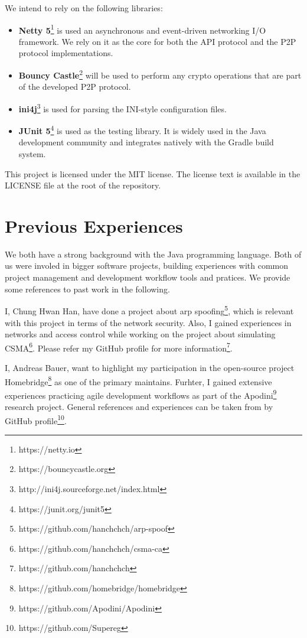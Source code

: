 \documentclass[a4paper, 11pt]{article}
\begin{document}
    We intend to rely on the following libraries:
    \begin{itemize}
        \setlength\itemsep{0em}
        \item \textbf{Netty 5}\footnote{https://netty.io} is used an asynchronous and event-driven networking I/O framework.
        We rely on it as the core for both the API protocol and the P2P protocol implementations.
        \item \textbf{Bouncy Castle}\footnote{https://bouncycastle.org} will be used to perform any crypto operations that are part of the developed P2P protocol.
        \item \textbf{ini4j}\footnote{http://ini4j.sourceforge.net/index.html} is used for parsing the INI-style configuration files.
        \item \textbf{JUnit 5}\footnote{https://junit.org/junit5} is used as the testing library.
        It is widely used in the Java development community and integrates natively with the Gradle build system.
    \end{itemize}

    This project is licensed under the MIT license.
    The license text is available in the LICENSE file at the root of the repository.

    \section{Previous Experiences}\label{sec:previous-experiences}

    We both have a strong background with the Java programming language.
    Both of us were involed in bigger software projects, building experiences with common project management
    and development workflow tools and pratices.
    We provide some references to past work in the following.

    I, Chung Hwan Han, have done a project about arp spoofing\footnote{https://github.com/hanchchch/arp-spoof}, 
    which is relevant with this project in terms of the network security.
    Also, I gained experiences in networks and access control while working on the project about simulating CSMA\footnote{https://github.com/hanchchch/csma-ca}.
    Please refer my GitHub profile for more information\footnote{https://github.com/hanchchch}.
    
    I, Andreas Bauer, want to highlight my participation in the open-source project Homebridge\footnote{https://github.com/homebridge/homebridge}
    as one of the primary maintains.
    Furhter, I gained extensive experiences practicing agile development workflows as part of the Apodini\footnote{https://github.com/Apodini/Apodini} research project.
    General references and experiences can be taken from by GitHub profile\footnote{https://github.com/Supereg}.
\end{document}
